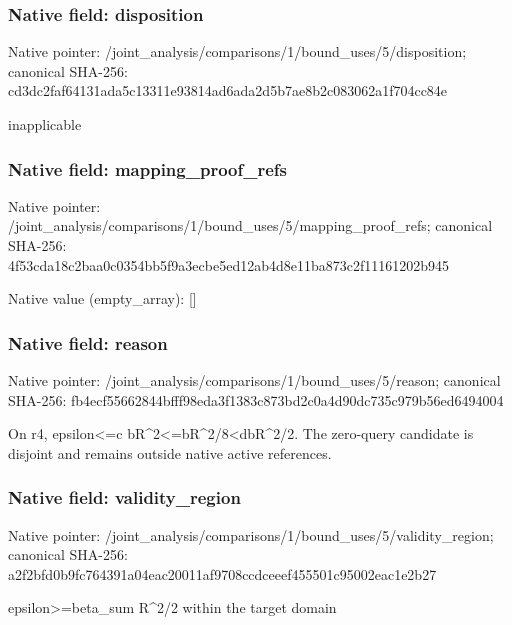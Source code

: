 \documentclass[10pt,a4paper]{article}
\begin{document}
\subsubsection{Native field: disposition}
Native pointer: /joint\_\allowbreak{}analysis/comparisons/1/bound\_\allowbreak{}uses/5/disposition; canonical SHA-256: cd3dc2faf64131ada5c13311e93814ad6ada2d5b7ae8b2c083062a1f704cc84e

\begingroup\raggedright\sloppy inapplicable\par\endgroup

\subsubsection{Native field: mapping\_\allowbreak{}proof\_\allowbreak{}refs}
Native pointer: /joint\_\allowbreak{}analysis/comparisons/1/bound\_\allowbreak{}uses/5/mapping\_\allowbreak{}proof\_\allowbreak{}refs; canonical SHA-256: 4f53cda18c2baa0c0354bb5f9a3ecbe5ed12ab4d8e11ba873c2f11161202b945

Native value (empty\_\allowbreak{}array): []

\subsubsection{Native field: reason}
Native pointer: /joint\_\allowbreak{}analysis/comparisons/1/bound\_\allowbreak{}uses/5/reason; canonical SHA-256: fb4ecf55662844bfff98eda3f1383c873bd2c0a4d90dc735c979b56ed6494004

\begingroup\raggedright\sloppy On r4,\allowbreak{} epsilon<=\allowbreak{}c bR\textasciicircum{}2<=\allowbreak{}bR\textasciicircum{}2/\allowbreak{}8<dbR\textasciicircum{}2/\allowbreak{}2. The zero-query candidate is disjoint and remains outside native active references.\par\endgroup

\subsubsection{Native field: validity\_\allowbreak{}region}
Native pointer: /joint\_\allowbreak{}analysis/comparisons/1/bound\_\allowbreak{}uses/5/validity\_\allowbreak{}region; canonical SHA-256: a2f2bfd0b9fc764391a04eac20011af9708ccdceeef455501c95002eac1e2b27

\begingroup\raggedright\sloppy epsilon>=\allowbreak{}beta\_\allowbreak{}sum R\textasciicircum{}2/\allowbreak{}2 within the target domain\par\endgroup
\end{document}
